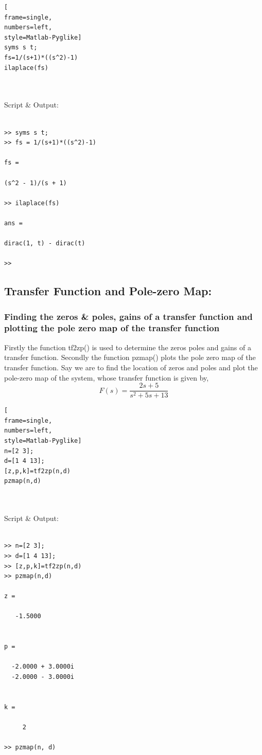 \documentclass[conference]{IEEEtran}
\begin{document}
\begin{lstlisting}[
frame=single,
numbers=left,
style=Matlab-Pyglike]
syms s t;
fs=1/(s+1)*((s^2)-1)
ilaplace(fs)



\end{lstlisting}

Script \& Output:

\begin{verbatim}

>> syms s t;
>> fs = 1/(s+1)*((s^2)-1)
 
fs =
 
(s^2 - 1)/(s + 1)
 
>> ilaplace(fs)
 
ans =
 
dirac(1, t) - dirac(t)
 
>> 
\end{verbatim}





\subsection{Transfer Function and Pole-zero Map:}\label{AA}
\subsubsection{Finding the zeros \& poles, gains of a transfer function and plotting the pole zero map of the transfer function}
Firstly the function tf2zp() is used to determine the zeros poles and gains of a transfer function. Secondly the function pzmap() plots the pole zero map of the transfer function.
Say we are to find the location of zeros and poles and plot the pole-zero map of the system, whose transfer function is given by, 
\[F(s) = \frac{2s + 5}{s^2+5s+13}\]



\begin{lstlisting}[
frame=single,
numbers=left,
style=Matlab-Pyglike]
n=[2 3];
d=[1 4 13];
[z,p,k]=tf2zp(n,d)
pzmap(n,d)



\end{lstlisting}

Script \& Output:

\begin{verbatim}

>> n=[2 3];
>> d=[1 4 13];
>> [z,p,k]=tf2zp(n,d)
>> pzmap(n,d)

z =

   -1.5000


p =

  -2.0000 + 3.0000i
  -2.0000 - 3.0000i


k =

     2

>> pzmap(n, d)

\end{verbatim}
\end{document}
